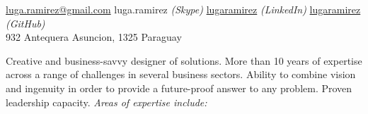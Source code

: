 \documentclass[10pt,a4paper]{article} %
\begin{document}
 



\noindent\href{mailto:luga.ramirez@gmail.com}{luga.ramirez@gmail.com}
\bull luga.ramirez \textit{(Skype)}
\bull \href{https://www.linkedin.com/in/lugaramirez/}{lugaramirez} \textit{(LinkedIn)}
\bull \href{https://github.com/lugaramirez}{lugaramirez} \textit{(GitHub)}\\
932 Antequera
\bull Asuncion, 1325
\bull Paraguay %

\spacedhrule{0.9em}{-0.4em} %



Creative and business-savvy designer of solutions. More than 10 years of expertise across a range of challenges in several business sectors. Ability to combine vision and ingenuity in order to provide a future-proof answer to any problem. Proven leadership capacity. \textit{Areas of expertise include:}

\vspace{-1em} %
\begin{multicols}{2}  %
{}
\end{multicols}
\end{document}
